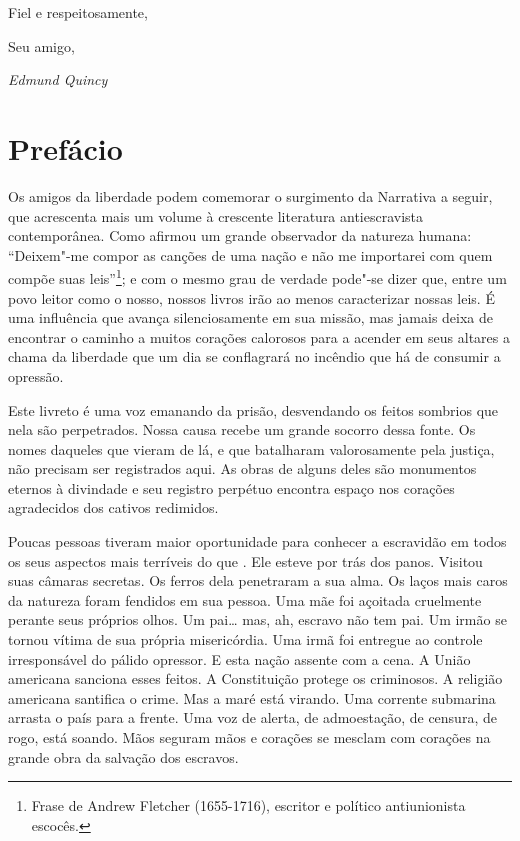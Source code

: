 Fiel e respeitosamente, 

Seu amigo,

\begin{flushright}
\emph{Edmund Quincy}
\end{flushright}

\chapter{Prefácio}

Os amigos da liberdade podem comemorar o surgimento da Narrativa a
seguir, que acrescenta mais um volume à crescente literatura
antiescravista contemporânea. Como afirmou um grande observador da
natureza humana: ``Deixem"-me compor as canções de uma nação e não me
importarei com quem compõe suas leis''\footnote{Frase de Andrew Fletcher
  (1655-1716), escritor e político antiunionista escocês.}; e com o
mesmo grau de verdade pode"-se dizer que, entre um povo leitor como o
nosso, nossos livros irão ao menos caracterizar nossas leis. É uma
influência que avança silenciosamente em sua missão, mas jamais deixa de
encontrar o caminho a muitos corações calorosos para a acender em seus
altares a chama da liberdade que um dia se conflagrará no incêndio que
há de consumir a opressão.

Este livreto é uma voz emanando da prisão, desvendando os feitos
sombrios que nela são perpetrados. Nossa causa recebe um grande socorro
dessa fonte. Os nomes daqueles que vieram de lá, e que batalharam
valorosamente pela justiça, não precisam ser registrados aqui. As obras
de alguns deles são monumentos eternos à divindade e seu registro
perpétuo encontra espaço nos corações agradecidos dos cativos redimidos.

Poucas pessoas tiveram maior oportunidade para conhecer a escravidão em
todos os seus aspectos mais terríveis do que . Ele
esteve por trás dos panos. Visitou suas câmaras secretas. Os ferros dela
penetraram a sua alma. Os laços mais caros da natureza foram fendidos em
sua pessoa. Uma mãe foi açoitada cruelmente perante seus próprios olhos.
Um pai\ldots{} mas, ah, escravo não tem pai. Um irmão se tornou vítima
de sua própria misericórdia. Uma irmã foi entregue ao controle
irresponsável do pálido opressor. E esta nação assente com a cena. A
União americana sanciona esses feitos. A Constituição protege os
criminosos. A religião americana santifica o crime. Mas a maré está
virando. Uma corrente submarina arrasta o país para a frente. Uma voz de
alerta, de admoestação, de censura, de rogo, está soando. Mãos seguram
mãos e corações se mesclam com corações na grande obra da salvação dos
escravos.

